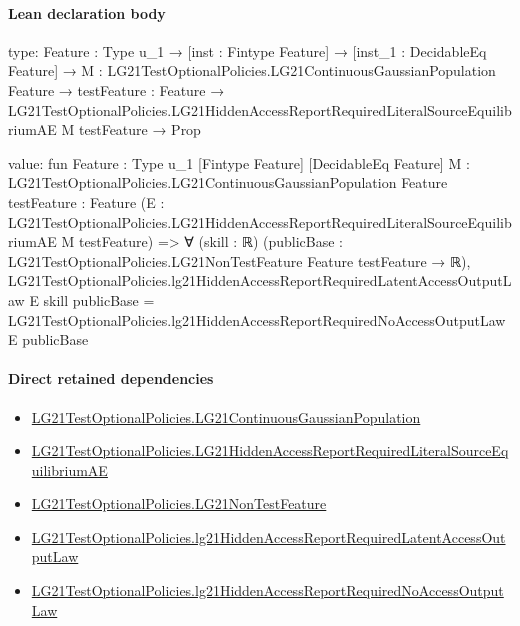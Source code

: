 \documentclass[10pt]{article}
\begin{document}
\paragraph{Lean declaration body}
\begin{ReviewVerbatim}
type:
{Feature : Type u_1} →
  [inst : Fintype Feature] →
    [inst_1 : DecidableEq Feature] →
      {M : LG21TestOptionalPolicies.LG21ContinuousGaussianPopulation Feature} →
        {testFeature : Feature} →
          LG21TestOptionalPolicies.LG21HiddenAccessReportRequiredLiteralSourceEquilibriumAE M testFeature → Prop

value:
fun {Feature : Type u_1} [Fintype Feature] [DecidableEq Feature]
    {M : LG21TestOptionalPolicies.LG21ContinuousGaussianPopulation Feature} {testFeature : Feature}
    (E : LG21TestOptionalPolicies.LG21HiddenAccessReportRequiredLiteralSourceEquilibriumAE M testFeature) =>
  ∀ (skill : ℝ) (publicBase : LG21TestOptionalPolicies.LG21NonTestFeature Feature testFeature → ℝ),
    LG21TestOptionalPolicies.lg21HiddenAccessReportRequiredLatentAccessOutputLaw E skill publicBase =
      LG21TestOptionalPolicies.lg21HiddenAccessReportRequiredNoAccessOutputLaw E publicBase
\end{ReviewVerbatim}

\paragraph{Direct retained dependencies}
\begin{itemize}\raggedright
\item \hyperlink{paper-prerequisite-f5e1c886d250142b}{LG21\allowbreak{}Test\allowbreak{}Optional\allowbreak{}Policies.\allowbreak{}LG21\allowbreak{}Continuous\allowbreak{}Gaussian\allowbreak{}Population}
\item \hyperlink{governing-declaration-99e6af37e85fd9c2}{LG21\allowbreak{}Test\allowbreak{}Optional\allowbreak{}Policies.\allowbreak{}LG21\allowbreak{}Hidden\allowbreak{}Access\allowbreak{}Report\allowbreak{}Required\allowbreak{}Literal\allowbreak{}Source\allowbreak{}Equilibrium\allowbreak{}AE}
\item \hyperlink{governing-declaration-81cb73bf3869c56d}{LG21\allowbreak{}Test\allowbreak{}Optional\allowbreak{}Policies.\allowbreak{}LG21\allowbreak{}Non\allowbreak{}Test\allowbreak{}Feature}
\item \hyperlink{governing-declaration-593c60a9af0247fe}{LG21\allowbreak{}Test\allowbreak{}Optional\allowbreak{}Policies.\allowbreak{}lg21\allowbreak{}Hidden\allowbreak{}Access\allowbreak{}Report\allowbreak{}Required\allowbreak{}Latent\allowbreak{}Access\allowbreak{}Output\allowbreak{}Law}
\item \hyperlink{governing-declaration-a0a13845604c7cb3}{LG21\allowbreak{}Test\allowbreak{}Optional\allowbreak{}Policies.\allowbreak{}lg21\allowbreak{}Hidden\allowbreak{}Access\allowbreak{}Report\allowbreak{}Required\allowbreak{}No\allowbreak{}Access\allowbreak{}Output\allowbreak{}Law}
\end{itemize}
\hypertarget{governing-declaration-7ba55cf202a3761e}{}
\end{document}
